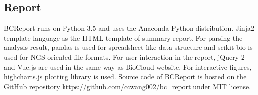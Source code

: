\subsection{Report}


BCReport runs on Python 3.5 and uses the Anaconda Python distribution. Jinja2
template language as the HTML template of summary report. For parsing the
analysis result, pandas is used for spreadsheet-like data structure and
scikit-bio is used for NGS oriented file formats. For user interaction in the
report, jQuery 2 and Vue.js are used in the same way as BioCloud website. For
interactive figures, highcharts.js plotting library is used. Source code of
BCReport is hosted on the GitHub repository
\url{https://github.com/ccwang002/bc_report} under MIT license.

